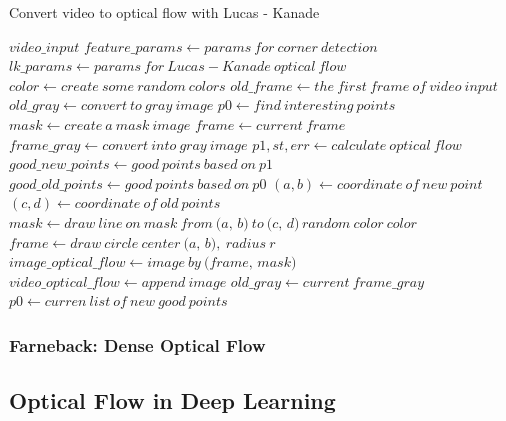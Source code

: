 \documentclass[a4paper, 12pt]{article}
\begin{document}
\begin{algorithm}
    \caption{Convert video to optical flow with Lucas - Kanade}
    \begin{algorithmic}[1]
        \Require $video\_input$
        \State $feature\_params \gets params \ for \ corner \ detection$
        \State $lk\_params \gets params \ for \ Lucas - Kanade \ optical \ flow$
        \State $color \gets create \ some \ random \ colors$
        \State $old\_frame \gets the \ first \ frame \ of \ video \ input $
        \State $old\_gray \gets convert \ to \ gray \ image$
        \State $p0 \gets find \ interesting \ points$
        \State $mask \gets create \ a \ mask \ image$
            \State $frame \gets current \ frame$
            \State $frame\_gray \gets convert \ into \ gray \ image$
            \State $p1, st, err \gets calculate \ optical \ flow $ 
            \State $good\_new\_points \gets good \ points \ based \ on \ p1$
            \State $good\_old\_points \gets good \ points \ based \ on \ p0$
                \State $(a, b) \gets coordinate \ of \ new \ point$
                \State $(c, d) \gets coordinate \ of \ old \ points$
                \State $mask \gets draw \ line \ on \ \textit{mask} \ from \ \textit{(a, b)} \ to \ \textit{(c, d)} \, random \ color \ \textit{color}$
                \State $frame \gets draw \ circle \ center \ \textit{(a, b)}, \ radius \ \textit{r}$
            \EndFor
            \State $image\_optical\_flow \gets image \ by \ \textit{(frame, mask)}$
            \State $video\_optical\_flow \gets append \ \textit{image}$
            \State $old\_gray \gets current \ frame\_gray$
            \State $p0 \gets curren \ list \ of \ new \ good \ points$
        \EndWhile
    \end{algorithmic}
\end{algorithm}

\subsubsection{Farneback: Dense Optical Flow}
\subsection{Optical Flow in Deep Learning}
\end{document}
